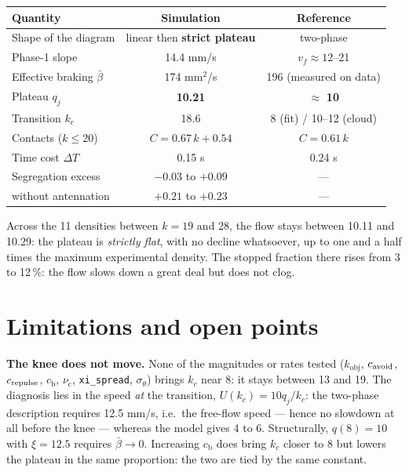 \documentclass[11pt,a4paper]{article}
\newcommand{\cruise}{\mathrm{c}}
\newcommand{\brake}{\mathrm{b}}
\newcommand{\obj}{\mathrm{obj}}
\newcommand{\code}[1]{\texttt{#1}}
\begin{document}
\begin{center}
\begin{tabular}{@{}lcc@{}}
\toprule
Quantity & Simulation & Reference \\
\midrule
Shape of the diagram & linear then \textbf{strict plateau} & two-phase \\
Phase-1 slope & 14.4 mm/s & $v_f\approx12$--21 \\
Effective braking $\bar\beta$ & 174 mm$^2$/s & 196 (measured on data) \\
Plateau $q_j$ & \textbf{10.21} & $\approx$ \textbf{10} \\
Transition $k_c$ & 18.6 & 8 (fit) / 10--12 (cloud) \\
Contacts ($k\leq20$) & $C=0.67\,k+0.54$ & $C=0.61\,k$ \\
Time cost $\Delta T$ & 0.15 s & 0.24 s \\
Segregation excess & $-0.03$ to $+0.09$ & --- \\
\quad without antennation & $+0.21$ to $+0.23$ & --- \\
\bottomrule
\end{tabular}
\end{center}

Across the 11 densities between $k=19$ and 28, the flow stays between 10.11 and
10.29: the plateau is \emph{strictly flat}, with no decline whatsoever, up to
one and a half times the maximum experimental density. The stopped fraction
there rises from 3 to 12\,\%: the flow slows down a great deal but does not
clog.

\section{Limitations and open points}

\textbf{The knee does not move.} None of the magnitudes or rates tested
($k_\obj$, $c_{\rm avoid}$, $c_{\rm repulse}$, $c_\brake$, $\nu_\cruise$,
\code{xi\_spread}, $\sigma_\theta$) brings $k_c$ near 8: it stays between 13 and
19. The diagnosis lies in the speed \emph{at} the transition,
$U(k_c)=10q_j/k_c$: the two-phase description requires 12.5 mm/s, i.e.\ the
free-flow speed --- hence no slowdown at all before the knee --- whereas the
model gives 4 to 6. Structurally, $q(8)=10$ with $\xi=12.5$ requires
$\bar\beta\to0$. Increasing $c_\brake$ does bring $k_c$ closer to 8 but lowers
the plateau in the same proportion: the two are tied by the same constant.
\end{document}
